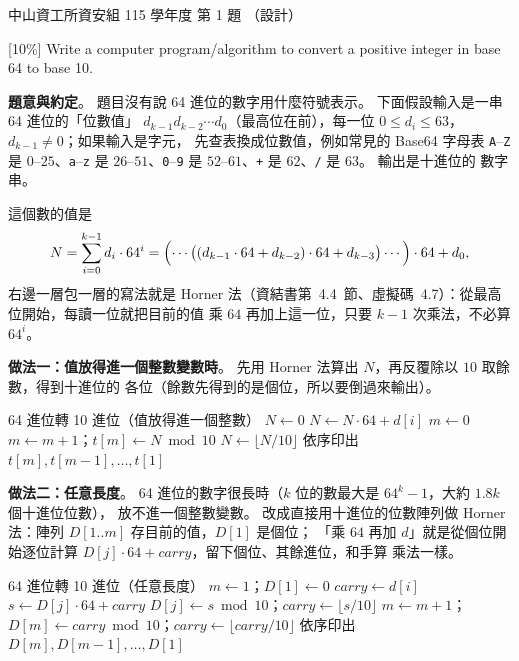 \begin{pastexam}[label={px:nsysu-115-dmalg-01}]{中山資工所資安組 115 學年度 第 1 題}
（設計）

{[}10\%{]} Write a computer program/algorithm to convert a positive integer in base 64 to base 10.
\end{pastexam}

\begin{pastsoln}
\textbf{題意與約定}。 題目沒有說 64 進位的數字用什麼符號表示。 下面假設輸入是一串 64 進位的「位數值」
$d_{k-1} d_{k-2} \cdots d_0$（最高位在前），每一位 $0 \le d_i \le 63$，$d_{k-1} \ne 0$；如果輸入是字元，
先查表換成位數值，例如常見的 Base64 字母表 \texttt{A}--\texttt{Z} 是 $0$--$25$、\texttt{a}--\texttt{z} 是
$26$--$51$、\texttt{0}--\texttt{9} 是 $52$--$61$、\texttt{+} 是 $62$、\texttt{/} 是 $63$。 輸出是十進位的
數字串。

這個數的值是
\[
N = \sum_{i=0}^{k-1} d_i \cdot 64^i
= \Bigl(\cdots\bigl((d_{k-1} \cdot 64 + d_{k-2}) \cdot 64 + d_{k-3}\bigr) \cdots\Bigr) \cdot 64 + d_0 ,
\]
右邊一層包一層的寫法就是 Horner 法（資結書第~4.4~節、虛擬碼~4.7）：從最高位開始，每讀一位就把目前的值
乘 $64$ 再加上這一位，只要 $k - 1$ 次乘法，不必算 $64^i$。

\textbf{做法一：值放得進一個整數變數時}。 先用 Horner 法算出 $N$，再反覆除以 $10$ 取餘數，得到十進位的
各位（餘數先得到的是個位，所以要倒過來輸出）。
\begin{pseudo}{64 進位轉 10 進位（值放得進一個整數）}
 
    \State $N \gets 0$
        \State $N \gets N \cdot 64 + d[i]$ 
    \EndFor
    \State $m \gets 0$
    \Repeat
        \State $m \gets m + 1$；$t[m] \gets N \bmod 10$
        \State $N \gets \lfloor N / 10 \rfloor$
    \State 依序印出 $t[m], t[m-1], \ldots, t[1]$
\EndProcedure
\end{pseudo}

\textbf{做法二：任意長度}。 64 進位的數字很長時（$k$ 位的數最大是 $64^k - 1$，大約 $1.8k$ 個十進位位數），
放不進一個整數變數。 改成直接用十進位的位數陣列做 Horner 法：陣列 $D[1..m]$ 存目前的值，$D[1]$ 是個位；
「乘 $64$ 再加 $d$」就是從個位開始逐位計算 $D[j] \cdot 64 + \mathit{carry}$，留下個位、其餘進位，和手算
乘法一樣。
\begin{pseudo}{64 進位轉 10 進位（任意長度）}
    \State $m \gets 1$；$D[1] \gets 0$
        \State $\mathit{carry} \gets d[i]$ 
            \State $s \gets D[j] \cdot 64 + \mathit{carry}$
            \State $D[j] \gets s \bmod 10$；$\mathit{carry} \gets \lfloor s / 10 \rfloor$
        \EndFor
            \State $m \gets m + 1$；$D[m] \gets \mathit{carry} \bmod 10$；$\mathit{carry} \gets \lfloor \mathit{carry} / 10 \rfloor$
        \EndWhile
    \EndFor
    \State 依序印出 $D[m], D[m-1], \ldots, D[1]$
\EndProcedure
\end{pseudo}


\end{pastsoln}
